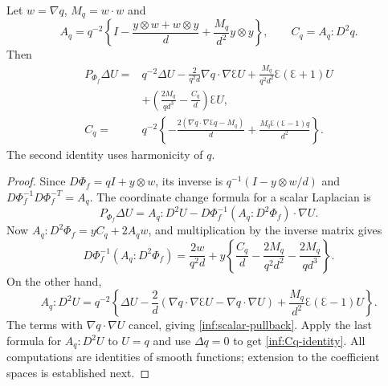 \begin{lemma}\label{inf:pullback}
Let $w=\nabla q$, $M_q=w\cdot w$ and
\begin{equation}\label{inf:pullback-metric}
 A_q=q^{-2}\left\{I-\frac{y\otimes w+w\otimes y}{d}
                         +\frac{M_q}{d^2}y\otimes y\right\},
 \qquad C_q=A_q:D^2q.
\end{equation}
Then
\begin{align}
 P_{\Phi_f}\Delta U={}&q^{-2}\Delta U
 -\frac2{q^2d}\nabla q\cdot\nabla\Euler U
 +\frac{M_q}{q^2d^2}\Euler(\Euler+1)U
 \label{inf:scalar-pullback}\\
 &+\left(\frac{2M_q}{qd^3}-\frac{C_q}{d}\right)\Euler U,\nonumber\\
 C_q={}&q^{-2}\left\{-\frac{2(\nabla q\cdot\nabla\Euler q-M_q)}d
                +\frac{M_q\Euler(\Euler-1)q}{d^2}\right\}.
 \label{inf:Cq-identity}
\end{align}
The second identity uses harmonicity of $q$.
\end{lemma}
\begin{proof}
Since $D\Phi_f=qI+y\otimes w$, its inverse is
$q^{-1}(I-y\otimes w/d)$ and
$D\Phi_f^{-1}D\Phi_f^{-T}=A_q$.
The coordinate change formula for a scalar Laplacian is
\[
 P_{\Phi_f}\Delta U=A_q:D^2U
   -D\Phi_f^{-1}(A_q:D^2\Phi_f)\cdot\nabla U.
\]
Now $A_q:D^2\Phi_f=yC_q+2A_qw$, and multiplication by the
inverse matrix gives
\[
 D\Phi_f^{-1}(A_q:D^2\Phi_f)
 =\frac{2w}{q^2d}
   +y\left\{\frac{C_q}d-\frac{2M_q}{q^2d^2}
                             -\frac{2M_q}{qd^3}\right\}.
\]
On the other hand,
\[
 A_q:D^2U=q^{-2}\left\{\Delta U-\frac2d
 (\nabla q\cdot\nabla\Euler U-\nabla q\cdot\nabla U)
             +\frac{M_q}{d^2}\Euler(\Euler-1)U\right\}.
\]
The terms with $\nabla q\cdot\nabla U$ cancel, giving
\eqref{inf:scalar-pullback}.
Apply the last formula for $A_q:D^2U$ to $U=q$ and use
$\Delta q=0$ to get \eqref{inf:Cq-identity}.
All computations are identities of smooth functions; extension to
the coefficient spaces is established next.
\end{proof}

